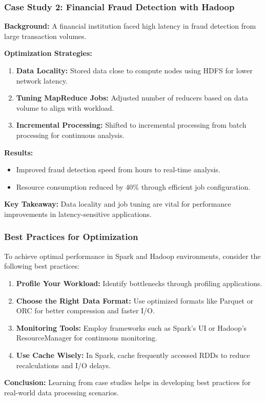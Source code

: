 \documentclass{beamer}
\begin{document}
\begin{frame}[fragile]
    \frametitle{Case Study 2: Financial Fraud Detection with Hadoop}
    
    \textbf{Background:} A financial institution faced high latency in fraud detection from large transaction volumes.

    \textbf{Optimization Strategies:}
    \begin{enumerate}
        \item \textbf{Data Locality:} Stored data close to compute nodes using HDFS for lower network latency.
        \item \textbf{Tuning MapReduce Jobs:} Adjusted number of reducers based on data volume to align with workload.
        \item \textbf{Incremental Processing:} Shifted to incremental processing from batch processing for continuous analysis.
    \end{enumerate}

    \textbf{Results:}
    \begin{itemize}
        \item Improved fraud detection speed from hours to real-time analysis.
        \item Resource consumption reduced by 40\% through efficient job configuration.
    \end{itemize}

    \textbf{Key Takeaway:} Data locality and job tuning are vital for performance improvements in latency-sensitive applications.
\end{frame}

\begin{frame}[fragile]
    \frametitle{Best Practices for Optimization}
    To achieve optimal performance in Spark and Hadoop environments, consider the following best practices:
    
    \begin{enumerate}
        \item \textbf{Profile Your Workload:} Identify bottlenecks through profiling applications.
        \item \textbf{Choose the Right Data Format:} Use optimized formats like Parquet or ORC for better compression and faster I/O.
        \item \textbf{Monitoring Tools:} Employ frameworks such as Spark's UI or Hadoop's ResourceManager for continuous monitoring.
        \item \textbf{Use Cache Wisely:} In Spark, cache frequently accessed RDDs to reduce recalculations and I/O delays.
    \end{enumerate}

    \textbf{Conclusion:} Learning from case studies helps in developing best practices for real-world data processing scenarios.
\end{frame}
\end{document}
